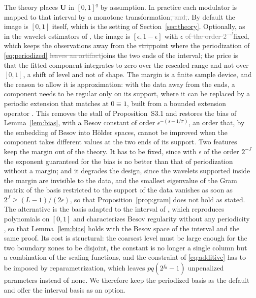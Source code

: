 \documentclass[12pt]{article} %
\theoremstyle{definition}
\newcommand{\jzero}{j_{0}}
\newcommand{\bU}{\mathbf{U}}
\begin{document}
The theory places $\bU$ in $[0,1]^q$ by assumption. In practice each modulator
is mapped to that interval by a monotone transformation\textcolor{gray}{\sout{, and,}}\textcolor{colR1}{.
By default the image is $[0,1]$ itself, which is the setting of
Section~\ref{sec:theory}. Optionally,} as in the
wavelet estimators of \citet*{Montoril-Chang-Vidakovic-2019}, the image is
$[\epsilon, 1-\epsilon]$ with $\epsilon$ \textcolor{gray}{\sout{of the order $2^{-J}$}}\textcolor{colR1}{fixed}, which keeps the
observations away from the \textcolor{gray}{\sout{strip}}\textcolor{colR1}{point} where the periodization of
\eqref{eq:periodized} \textcolor{gray}{\sout{leaves an artifact}}\textcolor{colR1}{joins the two ends of the interval}; the price is that the fitted
component integrates to zero over the rescaled range and not over $[0,1]$, a
shift of level and not of shape. \textcolor{colR1}{The margin is a finite sample
device, and the reason to allow it is approximation: with the data away from
the ends, a component needs to be regular only on its support, where it can be
replaced by a periodic extension that matches at $0 \equiv 1$, built from a
bounded extension operator \citep[Chapter~3]{Triebel-1983}. This removes the
stall of Proposition~S3.1 and restores the bias of Lemma~\ref{lem:bias}, with
a Besov constant of order $\epsilon^{-(s-1/\pi)}$, an order that, by the
embedding of Besov into H\"older spaces, cannot be improved when the component
takes different values at the two ends of its support. Two features keep the
margin out of the theory. It has to be fixed, since with $\epsilon$ of the
order $2^{-J}$ the exponent guaranteed for the bias is no better than that of
periodization without a margin; and it degrades the design, since the
wavelets supported inside the margin are invisible to the data, and the
smallest eigenvalue of the Gram matrix of the basis restricted to the support
of the data vanishes as soon as $2^{J} \ge (L-1)/(2\epsilon)$, so that
Proposition~\ref{prop:gram} does not hold as stated.} The alternative is the basis adapted to the
interval of \citet*{cohen1993wavelets}, which reproduces polynomials on $[0,1]$
and characterizes Besov regularity without any periodicity
\citep[Section 3.9]{Cohen-2003}, so that Lemma~\ref{lem:bias} holds with the
Besov space of the interval and the same proof. Its cost is structural: the
coarsest level must be large enough for the two boundary zones to be disjoint,
the constant is no longer a single column but a combination of the scaling
functions, and the constraint of \eqref{eq:additive} has to be imposed by
reparametrization, which leaves $pq(2^{\jzero}-1)$ unpenalized parameters
instead of none. We therefore keep the periodized basis as the default and
offer the interval basis as an option.
\end{document}
